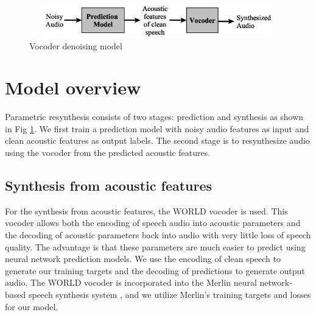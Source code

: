 \documentclass{article}
\begin{document}



\begin{figure}[htb]
\begin{minipage}[b]{1.0\linewidth}
  \centering
  \includegraphics[trim={0.15cm 0 0.35cm 0},clip, width=1.0\textwidth,height=1.4cm]{model.eps}
\end{minipage}
\caption{Vocoder denoising model}
\label{fig:model}
\end{figure}

\section{Model overview }
\label{sec:mod_ovr}
Parametric resynthesis consists of two stages: prediction and synthesis as shown in Fig \ref{fig:model}. We first train a prediction model with noisy audio features as input and clean acoustic features as output labels. The second stage is to resynthesize audio using the vocoder from the predicted acoustic features.

\subsection{Synthesis from acoustic features}
\label{sub:synth}
For the synthesis from acoustic features, the WORLD vocoder is used. This vocoder allows both the encoding of speech audio into acoustic parameters and the decoding of acoustic parameters back into audio with very little loss of speech quality.  The advantage is that these parameters are much easier to predict using neural network prediction models.  We use the encoding of clean speech to generate our training targets and the decoding of predictions to generate output audio.  The WORLD vocoder is incorporated into the Merlin neural network-based speech synthesis system \cite{wu2016merlin}, and we utilize Merlin's training targets and losses for our model.
\end{document}
